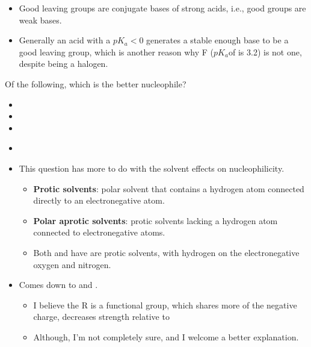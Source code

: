 \documentclass[12pt,a4paper]{article}
\begin{document}
\begin{enumerate}
\begin{itemize}
\begin{itemize}
            \begin{itemize}
                \item Good leaving groups are conjugate bases of strong acids, i.e., good groups are weak bases.
                \item Generally an acid with a \(pK_a < 0\) generates a stable enough base to be a good leaving group, which is another reason why F (\(pK_a\)of  is 3.2) is not one, despite being a halogen.
            \end{itemize}
        \end{itemize}
    \end{itemize}
    {\color{G-Moon}\item Of the following, which is the better nucleophile?
    \begin{itemize}
        \item {}
        \item {}
        \item {}
        \item {\color{o-Sun}\textbf{}}
    \end{itemize}
    }
    \begin{itemize}
        \item This question has more to do with the solvent effects on nucleophilicity.
            \begin{itemize}
                \item \textbf{Protic solvents}: polar solvent that {\color{o-Sun}contains} a hydrogen atom connected directly to an electronegative atom. 
                \item \textbf{Polar aprotic solvents}: protic solvents {\color{o-Sun}lacking} a hydrogen atom connected to electronegative atoms.
                \item Both  and  have are protic solvents, with hydrogen on the electronegative oxygen and nitrogen.
            \end{itemize}
        \item Comes down to  and .
            \begin{itemize}
                \item I believe the R is a functional group, which shares more of the negative charge, decreases strength relative to 
                \item Although, I'm not completely sure, and I welcome a better explanation.
            \end{itemize}
    \end{itemize}
\end{enumerate}
\end{document}
